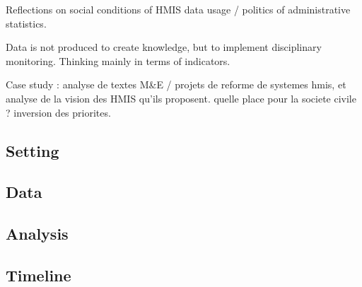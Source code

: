 \documentclass[a4paper,11pt,final,twoside]{article}
\begin{document}
Reflections on social conditions of HMIS data usage  / politics of administrative statistics.

Data is not produced to create knowledge, but to implement disciplinary monitoring. Thinking mainly in terms of indicators.

Case study : analyse de textes M\&E / projets de reforme de systemes hmis, et analyse de la vision des HMIS qu'ils proposent. quelle place pour la societe civile ? inversion des priorites.

    \subsection{Setting}

    \subsection{Data}

    \subsection{Analysis}

    \subsection{Timeline}


\newpage

\end{document}
